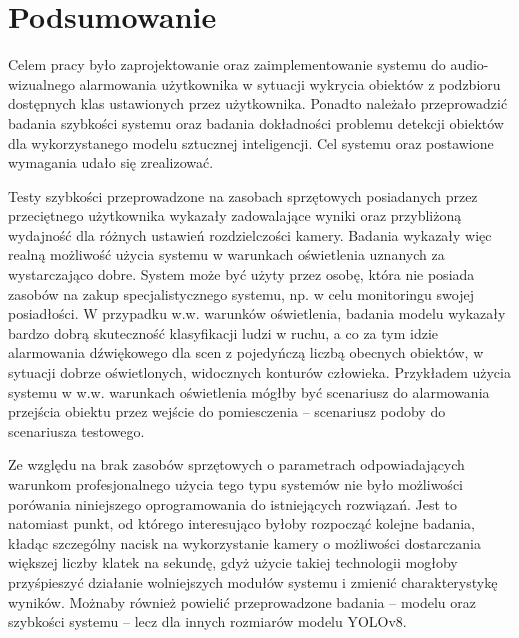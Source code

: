 \chapter{Podsumowanie}
\label{chap:podsumowanie}
Celem pracy było zaprojektowanie oraz zaimplementowanie systemu do audio-wizualnego alarmowania użytkownika w sytuacji wykrycia obiektów z podzbioru dostępnych klas ustawionych przez użytkownika. Ponadto należało przeprowadzić badania szybkości systemu oraz badania dokładności problemu detekcji obiektów dla wykorzystanego modelu sztucznej inteligencji.
Cel systemu oraz postawione wymagania udało się zrealizować.


Testy szybkości przeprowadzone na zasobach sprzętowych posiadanych przez przeciętnego użytkownika wykazały zadowalające wyniki oraz przybliżoną wydajność dla różnych ustawień rozdzielczości kamery. Badania wykazały więc realną możliwość użycia systemu w warunkach oświetlenia uznanych za wystarczająco dobre. System może być użyty przez osobę, która nie posiada zasobów na zakup specjalistycznego systemu, np. w celu monitoringu swojej posiadłości.
W przypadku w.w. warunków oświetlenia, badania modelu wykazały bardzo dobrą skuteczność klasyfikacji ludzi w ruchu, a co za tym idzie alarmowania dźwiękowego dla scen z pojedyńczą liczbą obecnych obiektów, w sytuacji dobrze oświetlonych, widocznych konturów człowieka. Przykładem użycia systemu w w.w. warunkach oświetlenia mógłby być scenariusz do alarmowania przejścia obiektu przez wejście do pomiesczenia -- scenariusz podoby do scenariusza testowego.  


Ze względu na brak zasobów sprzętowych o parametrach odpowiadających warunkom profesjonalnego użycia tego typu systemów nie było możliwości porówania niniejszego oprogramowania do istniejących rozwiązań. Jest to natomiast punkt, od którego interesująco byłoby rozpocząć kolejne badania, kładąc szczególny nacisk na wykorzystanie kamery o możliwości dostarczania większej liczby klatek na sekundę, gdyż użycie takiej technologii mogłoby przyśpieszyć działanie wolniejszych modułów systemu i zmienić charakterystykę wyników. Możnaby również powielić przeprowadzone badania -- modelu oraz szybkości systemu -- lecz dla innych rozmiarów modelu YOLOv8.  


